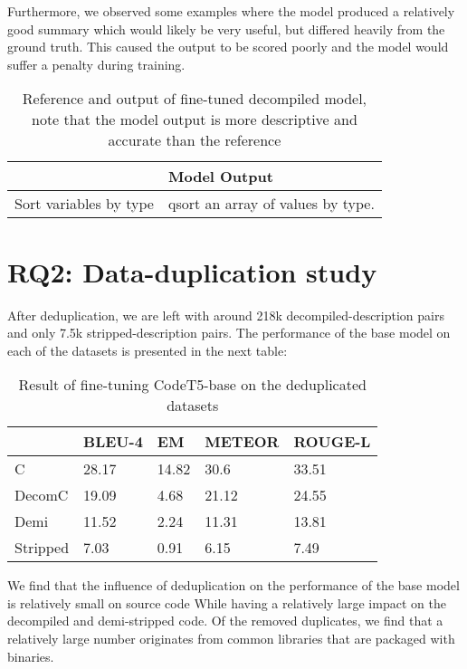 Furthermore, we observed some examples where the model produced a relatively good summary which would likely be very useful, but differed heavily from the ground truth. This caused the output to be scored poorly and the model would suffer a penalty during training.
\label{tab:betterOutput}
\begin{table}[!h]
\centering
\begin{tabular}{ll}
\hline
\rowcolor[HTML]{9B9B9B} 
\multicolumn{1}{|l}{\cellcolor[HTML]{9B9B9B}Reference} & \multicolumn{1}{l|}{\cellcolor[HTML]{9B9B9B}Model Output} \\ \hline
Sort variables by type                                 & qsort an array of values by type.       
\end{tabular}
\caption{Reference and output of fine-tuned decompiled model, note that the model output is more descriptive and accurate than the reference}
\end{table}


\section{RQ2: Data-duplication study}
After deduplication, we are left with around 218k decompiled-description pairs and only 7.5k stripped-description pairs. The performance of the base model on each of the datasets is presented in the next table:

\label{tab:deduplicated}
\begin{table}[!h]
\centering
\caption{Result of fine-tuning CodeT5-base on the deduplicated datasets}
\begin{tabular}{lllll} 
\hline
\rowcolor[rgb]{0.749,0.749,0.749} \multicolumn{1}{|l}{\textbf{Deduplicated}} & BLEU-4 & EM    & METEOR & \multicolumn{1}{l|}{ROUGE-L}  \\ 
\hline
C                                                                            & 28.17  & 14.82 & 30.6  &  33.51                             \\
DecomC                                                                       & 19.09  & 4.68  & 21.12  &  24.55                             \\
Demi                                                                         & 11.52  & 2.24  & 11.31  &  13.81
                             \\
Stripped                                                                     & 7.03   & 0.91  & 6.15  &  7.49                            
\end{tabular}
\end{table}
We find that the influence of deduplication on the performance of the base model is relatively small on source code While having a relatively large impact on the decompiled and demi-stripped code. 
Of the removed duplicates, we find that a relatively large number originates from common libraries that are packaged with binaries. 

